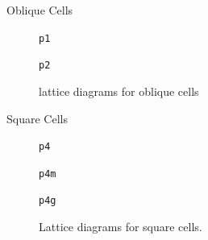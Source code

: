\documentclass{beamer}
\begin{document}
\begin{frame}{Oblique Cells}
  \begin{figure}
    \centering
    \begin{minipage}[t]{0.50\textwidth}
      \centering
      
      \caption*{\texttt{p1}}
    \end{minipage}\hspace{0cm}%
    \begin{minipage}[t]{0.45\textwidth}
      \centering
      
      \caption*{\texttt{p2}}
    \end{minipage}
    \caption{lattice diagrams for oblique cells}
  \end{figure}
\end{frame}

\begin{frame}{Square Cells}
  \begin{figure}
    \centering
    \begin{minipage}[t]{0.32\textwidth}
      \centering
      
      \caption*{\texttt{p4}}
    \end{minipage}\hfill%
    \begin{minipage}[t]{0.32\textwidth}
      \centering
      
      \caption*{\texttt{p4m}}
    \end{minipage}\hfill
    \begin{minipage}[t]{0.32\textwidth}
      \centering
      
      \caption*{\texttt{p4g}}
    \end{minipage}
    \caption{Lattice diagrams for square cells.}
  \end{figure}
\end{frame}
\end{document}
